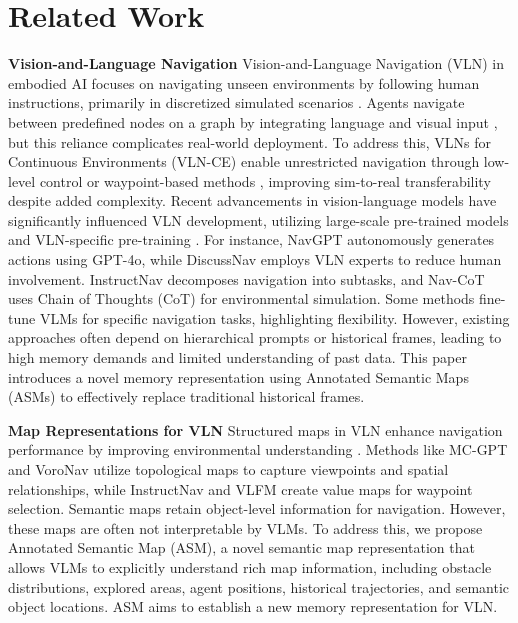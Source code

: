 \section{Related Work}
\label{sec2:related}
\textbf{Vision-and-Language Navigation}  
Vision-and-Language Navigation (VLN) \cite{gu2022vision,park2023visual} in embodied AI focuses on navigating unseen environments by following human instructions, primarily in discretized simulated scenarios \cite{anderson2020rxr, thomason2020cvdn}. Agents navigate between predefined nodes on a graph by integrating language and visual input \cite{qi2020object, liu2024volumetric}, but this reliance complicates real-world deployment.
To address this, VLNs for Continuous Environments (VLN-CE) \cite{krantz2020beyond, savva2019habitat} enable unrestricted navigation through low-level control or waypoint-based methods \cite{hong2022bridging, krantz2021waypoint}, improving sim-to-real transferability despite added complexity.
Recent advancements in vision-language models have significantly influenced VLN development, utilizing large-scale pre-trained models \cite{zhang2024navid, zheng2024towards} and VLN-specific pre-training \cite{hao2020prevalent, wu2022cross}. For instance, NavGPT \cite{zhou2024navgpt} autonomously generates actions using GPT-4o, while DiscussNav \cite{long2024discuss} employs VLN experts to reduce human involvement. InstructNav \cite{long2024instructnav} decomposes navigation into subtasks, and Nav-CoT \cite{lin2024navcot} uses Chain of Thoughts (CoT) \cite{wei2022chain} for environmental simulation. Some methods \cite{zheng2024towards, zhang2024navid} fine-tune VLMs for specific navigation tasks, highlighting flexibility. However, existing approaches often depend on hierarchical prompts or historical frames, leading to high memory demands and limited understanding of past data.
This paper introduces a novel memory representation using Annotated Semantic Maps (ASMs) to effectively replace traditional historical frames.






\noindent\textbf{Map Representations for VLN} 
Structured maps in VLN enhance navigation performance by improving environmental understanding \cite{wang2023gridmm, hong2023ego2map}. 
Methods like MC-GPT \cite{zhan2024mc} and VoroNav \cite{wu2024voronav} utilize topological maps to capture viewpoints and spatial relationships, while InstructNav \cite{long2024instructnav} and VLFM \cite{yokoyama2024vlfm} create value maps for waypoint selection.
Semantic maps \cite{zhang2024trihelper, zhang2024multi, hong2023ego2map, yu2023l3mvn} retain object-level information for navigation. However, these maps are often not interpretable by VLMs.
To address this, we propose Annotated Semantic
Map (ASM), a novel semantic map representation that allows VLMs to explicitly understand rich map information, including obstacle distributions, explored areas, agent positions, historical trajectories, and semantic object locations. 
ASM aims to establish a new memory representation for VLN.



